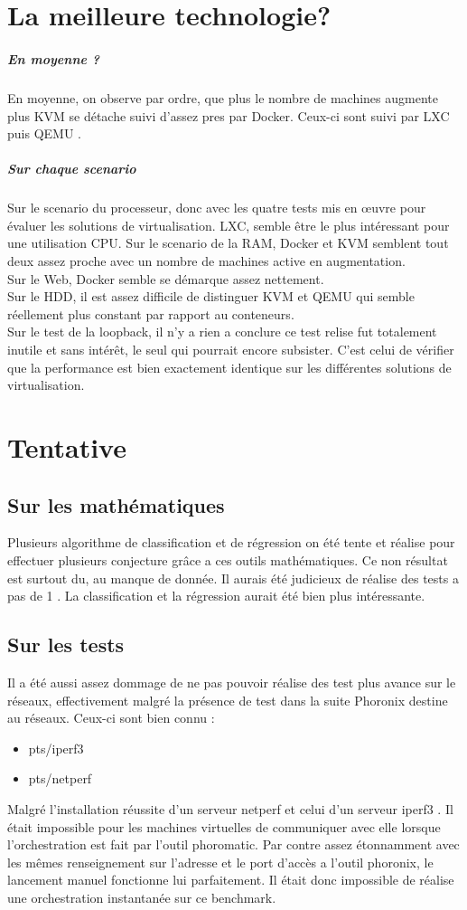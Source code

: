 \section{La meilleure technologie?}
\subparagraph{En moyenne ?}
En moyenne, on observe par ordre, que plus le nombre de machines augmente plus KVM se détache suivi d'assez pres par Docker. Ceux-ci sont suivi par LXC puis QEMU .
\subparagraph{Sur chaque scenario}
Sur le scenario du processeur, donc avec les quatre tests mis en œuvre pour évaluer les solutions de virtualisation. LXC, semble être le plus intéressant pour une utilisation CPU.
Sur le scenario de la RAM, Docker et KVM semblent tout deux assez proche avec un nombre de machines active en augmentation.\\
Sur le Web, Docker semble se démarque assez nettement.\\
Sur le HDD, il est assez difficile de distinguer KVM et QEMU qui semble réellement plus constant par rapport au conteneurs.\\
Sur le test de la loopback, il n'y a rien a conclure ce test relise fut totalement inutile et sans intérêt, le seul qui pourrait encore subsister. C'est celui de vérifier que la performance est bien exactement identique sur les différentes solutions de virtualisation.\\
\section{Tentative}
\subsection{Sur les mathématiques}
Plusieurs algorithme de classification et de régression on été tente et réalise pour effectuer plusieurs conjecture grâce a ces outils mathématiques. Ce non résultat est surtout du, au manque de donnée. Il aurais été judicieux de réalise des tests a pas de 1 . La classification et la régression aurait été bien plus intéressante.
\subsection{Sur les tests}
Il a été aussi assez dommage de ne pas pouvoir réalise des test plus avance sur le réseaux, effectivement malgré la présence de test dans la suite Phoronix destine au réseaux. Ceux-ci sont bien connu : 
\begin{itemize}
\item pts/iperf3
\item pts/netperf
\end{itemize}
Malgré l'installation réussite d'un serveur netperf et celui d'un serveur iperf3 .
Il était impossible pour les machines virtuelles de communiquer avec elle lorsque l'orchestration est fait par l'outil phoromatic.
Par contre assez étonnamment avec les mêmes renseignement sur l'adresse et le port d’accès a l’outil phoronix, le lancement manuel fonctionne lui parfaitement.
Il était donc impossible de réalise une orchestration instantanée sur ce benchmark.

